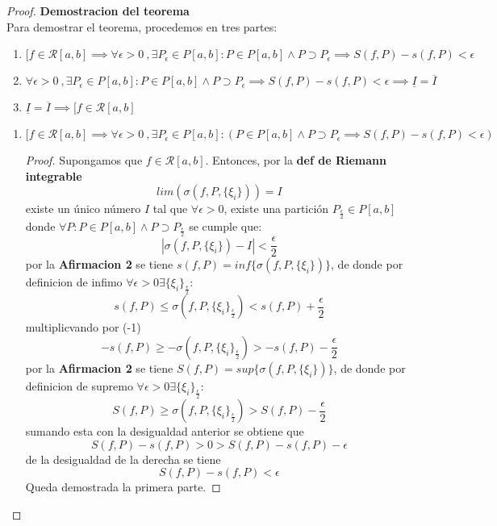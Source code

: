 \documentclass{article}
\begin{document}
\begin{proof}\textbf{Demostracion del teorema}\\

Para demostrar el teorema, procedemos en tres partes:
\begin{enumerate}
\item \([f \in \mathcal{R}[a, b] \implies \forall \epsilon>0\ ,  \exists P_\epsilon \in P[a, b]: P \in P[a, b] \wedge P \supset P_\epsilon \implies S(f, P) - s(f, P) < \epsilon\)
\item  \(\forall \epsilon>0\ ,  \exists P_\epsilon \in P[a, b]: P \in P[a, b] \wedge P \supset P_\epsilon \implies S(f, P) - s(f, P) < \epsilon \implies \underline{I} = \overline{I}\)
\item \(\underline{I} = \overline{I} \implies [f \in \mathcal{R}[a, b]\)
\end{enumerate}
\begin{enumerate}
  \item \([f \in \mathcal{R}[a, b] \implies \forall \epsilon>0\ ,  \exists P_\epsilon \in P[a, b]: (P \in P[a, b] \wedge P \supset P_\epsilon \implies S(f, P) - s(f, P) < \epsilon)\)
\begin{proof}

 Supongamos que \( f  \in \mathcal{R}[a, b]\). Entonces, por la \textbf{def de Riemann integrable}
\[
lim(\sigma(f, P,\{\xi_i\})) = I
\]
existe un único número \( I \) tal que \( \forall \epsilon > 0 \), existe una partición \( P_\frac{\epsilon}{2} \in P[a, b]\)  donde \(\forall P: P \in P[a, b] \wedge P \supset P_\frac{\epsilon}{2}\) se cumple que:
    \[
    |\sigma(f, P,\{\xi_i\}) - I| < \frac\epsilon2
    \]
por la \textbf{Afirmacion 2} se tiene \(s(f, P) = inf\{\sigma(f, P,\{\xi_i\})\}\), de donde por definicion de infimo
\( \forall \epsilon> 0 \exists \{\xi_i\}_\frac{\epsilon}{2}:\)
\[
s(f, P) \leq \sigma(f, P,\{\xi_i\}_\frac{\epsilon}{2}) < s(f, P) + \frac{\epsilon}{2}
\]
multiplicvando por (-1)
\[
-s(f, P) \geq -\sigma(f, P,\{\xi_i\}_\frac{\epsilon}{2}) > -s(f, P) - \frac{\epsilon}{2}
\]
por la \textbf{Afirmacion 2} se tiene \(S(f, P) = sup\{\sigma(f, P,\{\xi_i\})\}\), de donde por definicion de supremo 
\( \forall \epsilon> 0 \exists \{\xi_i\}_\frac{\epsilon}{2}:\)
\[
S(f, P) \geq \sigma(f, P,\{\xi_i\}_\frac{\epsilon}{2}) > S(f, P) - \frac{\epsilon}{2}
\]
sumando esta con la desigualdad anterior se obtiene que
\[
S(f,P) - s(f,P) > 0 > S(f, P) - s(f, P) - \epsilon
\]
 de la desigualdad de la derecha se tiene
\[
S(f, P) - s(f, P) < \epsilon
\]
Queda demostrada la primera parte.


\end{proof}
\end{enumerate}
\end{proof}
\end{document}
